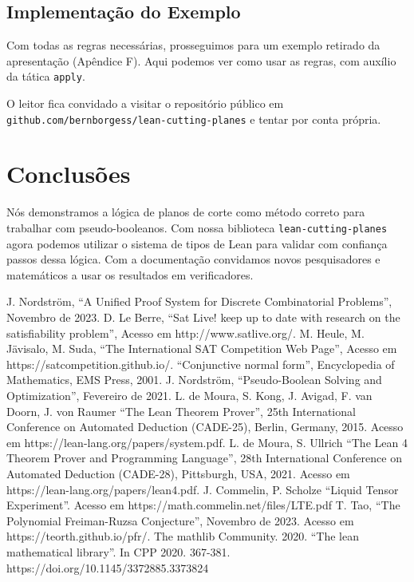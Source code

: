 \documentclass[conference]{IEEEtran}
\begin{document}

\newpage
\subsection{Implementação do Exemplo}
Com todas as regras necessárias, prosseguimos para um exemplo retirado da apresentação
(Apêndice F). Aqui podemos ver como usar as regras, com auxílio da tática \texttt{apply}.


O leitor fica convidado a visitar o repositório público em \texttt{github.com/bernborgess/lean-cutting-planes}
e tentar por conta própria.


\section*{Conclusões}
Nós demonstramos a lógica de planos de corte como método correto para trabalhar com pseudo-booleanos.
Com nossa biblioteca \texttt{lean-cutting-planes} agora podemos utilizar o sistema de tipos de Lean
para validar com confiança passos dessa lógica. Com a documentação convidamos novos pesquisadores e
matemáticos a usar os resultados em verificadores.


\begin{thebibliography}{00}
          J. Nordström, ``A Unified Proof System for Discrete Combinatorial Problems'', Novembro de 2023.
           D. Le Berre, ``Sat Live! keep up to date with research on the satisfiability problem'', Acesso em http://www.satlive.org/.
           M. Heule, M. Jävisalo, M. Suda, ``The International SAT Competition Web Page'', Acesso em https://satcompetition.github.io/.
               ``Conjunctive normal form'', Encyclopedia of Mathematics, EMS Press, 2001.
           J. Nordström, ``Pseudo-Boolean Solving and Optimization'', Fevereiro de 2021.
        L. de Moura, S. Kong, J. Avigad, F. van Doorn, J. von Raumer ``The Lean Theorem Prover'', 25th International Conference on Automated Deduction (CADE-25), Berlin, Germany, 2015. Acesso em https://lean-lang.org/papers/system.pdf.
             L. de Moura, S. Ullrich ``The Lean 4 Theorem Prover and Programming Language'', 28th International Conference on Automated Deduction (CADE-28), Pittsburgh, USA, 2021. Acesso em https://lean-lang.org/papers/lean4.pdf.
               J. Commelin, P. Scholze ``Liquid Tensor Experiment''. Acesso em https://math.commelin.net/files/LTE.pdf
               T. Tao, ``The Polynomial Freiman-Ruzsa Conjecture'', Novembro de 2023. Acesso em https://teorth.github.io/pfr/.
          The mathlib Community. 2020. ``The lean mathematical library''. In CPP 2020. 367-381. https://doi.org/10.1145/3372885.3373824
\end{thebibliography}
\end{document}
